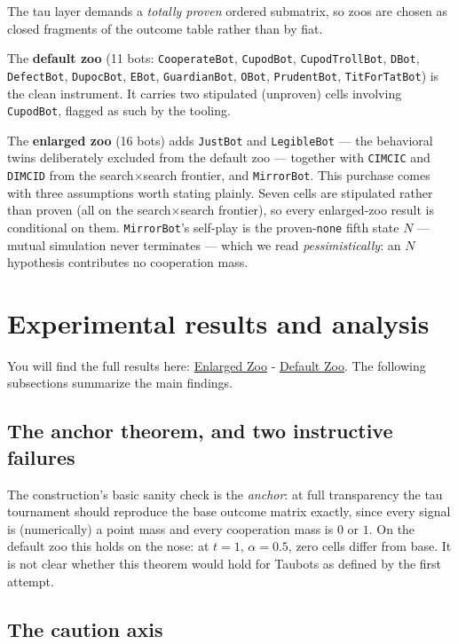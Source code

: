 \documentclass[11pt]{article}
\newcommand{\zoobot}[1]{\texttt{#1}}
\newcommand{\dupoc}{\zoobot{DupocBot}}
\newcommand{\cupod}{\zoobot{CupodBot}}
\newcommand{\cimcic}{\zoobot{CIMCIC}}
\newcommand{\dimcid}{\zoobot{DIMCID}}
\begin{document}
The tau layer demands a \emph{totally proven} ordered submatrix, so zoos
are chosen as closed fragments of the outcome table rather than by fiat.

The \textbf{default zoo} (11 bots: \zoobot{CooperateBot}, \cupod,
\zoobot{CupodTrollBot}, \zoobot{DBot}, \zoobot{DefectBot}, \dupoc,
\zoobot{EBot}, \zoobot{GuardianBot}, \zoobot{OBot}, \zoobot{PrudentBot},
\zoobot{TitForTatBot}) is the clean instrument. It carries two stipulated (unproven) cells involving
\cupod, flagged as such by the tooling.

The \textbf{enlarged zoo} (16 bots) adds \zoobot{JustBot} and
\zoobot{LegibleBot} --- the behavioral twins deliberately excluded from
the default zoo --- together with \cimcic{} and \dimcid{} from the
search$\times$search frontier, and \zoobot{MirrorBot}. This purchase comes
with three assumptions worth stating plainly. Seven cells are stipulated
rather than proven (all on the search$\times$search frontier), so every
enlarged-zoo result is conditional on them. \zoobot{MirrorBot}'s self-play
is the proven-\texttt{none} fifth state $N$ --- mutual simulation never
terminates --- which we read \emph{pessimistically}: an $N$ hypothesis
contributes no cooperation mass. 
\section{Experimental results and analysis}

You will find the full results here: \href{https://claude.ai/code/artifact/0db08fb2-3379-4136-ab78-3673a3bf6621}{Enlarged Zoo} - \href{https://claude.ai/code/artifact/5eec0ef0-eba7-4a48-847b-f5c0ee9b0e5a}{Default Zoo}. The following subsections summarize the main findings.

\subsection{The anchor theorem, and two instructive failures}

The construction's basic sanity check is the \emph{anchor}: at full
transparency the tau tournament should reproduce the base outcome matrix
exactly, since every signal is (numerically) a point mass and every
cooperation mass is $0$ or $1$. On the default zoo this holds on the nose:
at $t = 1$, $\alpha = 0.5$, zero cells differ from base. It is not clear whether this theorem would hold for Taubots as defined by the first attempt.

\subsection{The caution axis}
\end{document}
